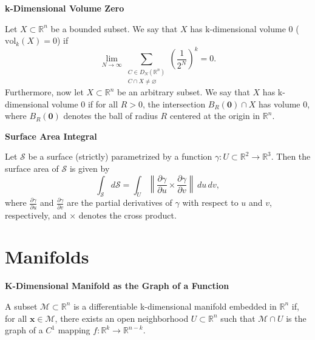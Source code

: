 \documentclass{article}
\newcommand{\R}{\mathbb{R}}
\newenvironment{definition}[1]{
    \par\noindent\textbf{#1}\par\noindent
}{
    \par \vspace{0.5cm}
}
\begin{document}
\begin{definition}{k-Dimensional Volume Zero}
Let \(X \subset \R^n\) be a bounded subset. We say that \(X\) has k-dimensional volume \(0\) (\(\text{vol}_k(X) = 0\)) if 
\[
\lim_{N \to \infty} \sum_{\substack{C \in D_N(\R^n) \\ C \cap X \neq \varnothing}} \left(\frac{1}{2^N}\right)^k = 0.
\]
Furthermore, now let \( X \subset \R^n \) be an arbitrary subset. We say that \(X\) has k-dimensional volume \(0\) if for all \(R > 0\), the intersection \(B_R(\bm{0}) \cap X\) has volume \(0\), where \(B_R(\bm{0})\) denotes the ball of radius \(R\) centered at the origin in \(\R^n\).
\end{definition}

\begin{definition}{Surface Area Integral}
Let \(\mathcal{S}\) be a surface (strictly) parametrized by a function \(\gamma : U \subset \R^2 \to \R^3\). Then the surface area of \(\mathcal{S}\) is given by
\[
\int_{\mathcal{S}} d\mathcal{S} = \int_{U} \left\| \frac{\partial \gamma}{\partial u} \times \frac{\partial \gamma}{\partial v} \right\| \, du \, dv,
\]
where \(\frac{\partial \gamma}{\partial u}\) and \(\frac{\partial \gamma}{\partial v}\) are the partial derivatives of \(\gamma\) with respect to \(u\) and \(v\), respectively, and \(\times\) denotes the cross product.
\end{definition}


\section{Manifolds}

\begin{definition}{K-Dimensional Manifold as the Graph of a Function}
A subset \(\mathcal{M} \subset \R^n\) is a differentiable k-dimensional manifold embedded in \(\R^n\) if, for all \(\bm{x} \in \mathcal{M}\), there exists an open neighborhood \(U \subset \R^n\) such that \(\mathcal{M} \cap U\) is the graph of a \(C^1\) mapping \(f : \R^k \to \R^{n-k}\).
\end{definition}
\end{document}
